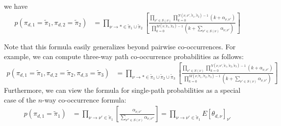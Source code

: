 \documentclass{article}
\begin{document}
we have
\begin{align}
p(\pi_{d,1} = \tilde\pi_1, \pi_{d,2} = \tilde\pi_2)
&=
\prod_{\nu \to * \in \tilde\pi_1 \cup \tilde\pi_2}
\left[
\frac
  {
    \prod_{\nu' \in S(\nu)}
    \prod_{k=0}^{N(\nu,\nu',\tilde\pi_1,\tilde\pi_2) - 1}
    (k + \alpha_{\nu,\nu'})
  }
  {
    \prod_{k=0}^{M(\nu,\tilde\pi_1,\tilde\pi_2) - 1}
    \left(
      k + \sum_{\nu' \in S(\nu)}\alpha_{\nu,\nu'}
    \right)
  }
\right]
\end{align}

Note that this formula easily generalizes beyond pairwise co-occurrences.
For example, we can compute three-way path co-occurrence probabilities as follows:
\begin{align}
p(\pi_{d,1} = \tilde\pi_1, \pi_{d,2} = \tilde\pi_2, \pi_{d,3} = \tilde\pi_3)
&=
\prod_{\nu \to * \in \tilde\pi_1 \cup \tilde\pi_2 \cup \tilde\pi_3}
\left[
\frac
  {
    \prod_{\nu' \in S(\nu)}
    \prod_{k=0}^{N(\nu,\nu',\tilde\pi_1,\tilde\pi_2,\tilde\pi_3) - 1}
    (k + \alpha_{\nu,\nu'})
  }
  {
    \prod_{k=0}^{M(\nu,\tilde\pi_1,\tilde\pi_2,\tilde\pi_3) - 1}
    \left(
      k + \sum_{\nu' \in S(\nu)}\alpha_{\nu,\nu'}
    \right)
  }
\right]
\end{align}
Furthermore, we can view the formula for single-path probabilities as a special case of the $n$-way co-occurrence formula:
\begin{align}
p(\pi_{d,1} = \tilde\pi_1)
&=
\prod_{\nu \to \nu' \in \tilde\pi_1}
\left[
\frac
  {
    \alpha_{\nu,\nu'}
  }
  {
    \sum_{\nu'' \in S(\nu)}\alpha_{\nu,\nu''}
  }
\right]
=
\prod_{\nu \to \nu' \in \tilde\pi_1}
E[\theta_{d,\nu}]_{\nu'}
\end{align}
\end{document}
